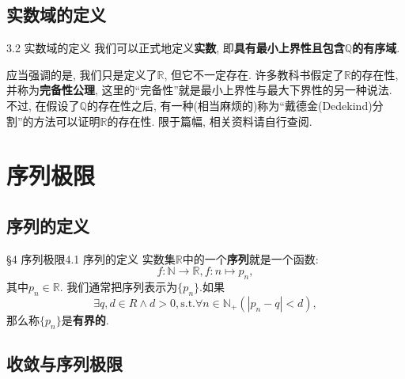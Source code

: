 \documentclass[serif]{beamer}
\begin{document}
\subsection{\kaishu 实数域的定义}

\begin{frame}{3.2 实数域的定义}
	我们可以正式地定义\textbf{实数}, 即\textbf{具有最小上界性且包含$\mathbb{Q}$的有序域}.\par 
	应当强调的是, 我们只是定义了$\mathbb{R}$, 但它不一定存在. 许多教科书假定了$\mathbb{R}$的存在性, 并称为\textbf{完备性公理}, 这里的“完备性”就是最小上界性与最大下界性的另一种说法. 不过, 在假设了$\mathbb{Q}$的存在性之后, 有一种(相当麻烦的)称为“戴德金(Dedekind)分割”的方法可以证明$\mathbb{R}$的存在性. 限于篇幅, 相关资料请自行查阅.
\end{frame}

\section{\heiti 序列极限}
\subsection{\kaishu 序列的定义}

\begin{frame}{\S4 序列极限}{4.1 序列的定义}
	实数集$\mathbb{R}$中的一个\textbf{序列}就是一个函数:
	\[f:\mathbb{N}\rightarrow\mathbb{R}, f: n\mapsto p_n,\]
	其中$p_n\in\mathbb{R}$. 我们通常把序列表示为$\{p_n\}$.如果
	\[\exists q,d\in R\wedge d>0, \mathrm{s.t.}\forall n\in\mathbb{N}_+(|p_n-q|<d),\]
	那么称$\{p_n\}$是\textbf{有界的}.
\end{frame}

\subsection{\kaishu 收敛与序列极限}
\end{document}

